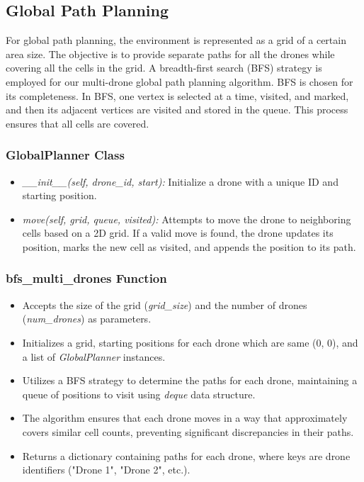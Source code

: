 
\subsection{Global Path Planning}

For global path planning, the environment is represented as a grid of a certain area size. The objective is to provide separate paths for all the drones while covering all the cells in the grid. A breadth-first search (BFS) strategy is employed for our multi-drone global path planning algorithm. BFS is chosen for its completeness. In BFS, one vertex is selected at a time, visited, and marked, and then its adjacent vertices are visited and stored in the queue. This process ensures that all cells are covered.

\subsubsection{GlobalPlanner Class}

\begin{itemize}
    \item \textit{\_\_init\_\_(self, drone\_id, start):} Initialize a drone with a unique ID and starting position.
    \item \textit{move(self, grid, queue, visited):} Attempts to move the drone to neighboring cells based on a 2D grid. If a valid move is found, the drone updates its position, marks the new cell as visited, and appends the position to its path.
\end{itemize}

\subsubsection{bfs\_multi\_drones Function}

\begin{itemize}
    \item Accepts the size of the grid (\textit{grid\_size}) and the number of drones (\textit{num\_drones}) as parameters.
    \item Initializes a grid, starting positions for each drone which are same (0, 0), and a list of \textit{GlobalPlanner} instances.
    \item Utilizes a BFS strategy to determine the paths for each drone, maintaining a queue of positions to visit using \textit{deque} data structure.
    \item The algorithm ensures that each drone moves in a way that approximately covers similar cell counts, preventing significant discrepancies in their paths.
    \item Returns a dictionary containing paths for each drone, where keys are drone identifiers ("Drone 1", "Drone 2", etc.).
\end{itemize}

